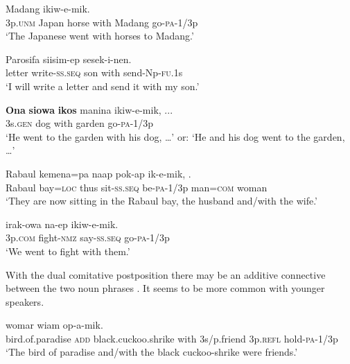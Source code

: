 \ea%
\label{ex:4:x829}
\gll {}     Madang  ikiw-e-mik. \\
    3p.\textsc{unm}  Japan  horse  with  Madang  go-\textsc{pa}-1/3p  \\
\glt`The Japanese went with horses to Madang.'
\z

\ea%
\label{ex:4:x830}
\gll Parosifa  siisim-ep     sesek-i-nen. \\
    letter  write-\textsc{ss}.\textsc{seq}  son  with  send-Np-\textsc{fu}.1s  \\
\glt`I will write a letter and send it with my son.'
\z

\ea%
\label{ex:4:x819}
\gll \textbf{Ona} \textbf{siowa} \textbf{ikos}  manina  ikiw-e-mik, ... \\
  3s.\textsc{gen}  dog  with  garden  go-\textsc{pa}-1/3p    \\
\glt`He went to the garden with his dog, {\dots}' or: `He and his dog went to the garden, {\dots}'
\z

\ea%
\label{ex:4:x832}
\gll Rabaul  kemena=pa  naap  pok-ap  ik-e-mik,   . \\
    Rabaul  bay=\textsc{loc}  thus  sit-\textsc{ss}.\textsc{seq}  be-\textsc{pa}-1/3p  man=\textsc{com}  woman  \\
\glt`They are now sitting in the Rabaul bay, the husband and/with the wife.'
\z

\ea%
\label{ex:4:x831}
\gll {}  irak-owa  na-ep  ikiw-e-mik. \\
  3p.\textsc{com}  fight-\textsc{nmz}  say-\textsc{ss}.\textsc{seq}  go-\textsc{pa}-1/3p    \\
\glt`We went to fight with them.'
\z

With the dual comitative postposition   there may be an additive connective  between the two noun phrases . It seems to be more common with younger speakers. 

\ea%
\label{ex:4:x820}
\gll {}     womar wiam  op-a-mik. \\
   bird.of.paradise  \textsc{add}  black.cuckoo.shrike  with  3s/p.friend  3p.\textsc{refl}  hold-\textsc{pa}-1/3p   \\
\glt`The bird of paradise and/with the black cuckoo-shrike were friends.'
\z


